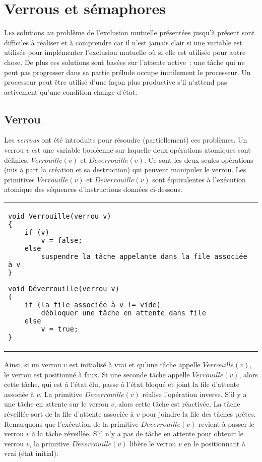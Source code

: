 \chapter{Verrous et sémaphores}
\startchapter

\lettrine[lines=4]{L}{es} solutions au problème de l'exclusion mutuelle présentées jusqu'à présent sont difficiles à réaliser et à comprendre car il n'est jamais clair si une variable est utilisée pour implémenter l'exclusion mutuelle où si elle est utilisée pour autre chose.
De plus ces solutions sont basées sur l'attente active~:  une tâche qui ne peut pas progresser dans sa partie prélude occupe inutilement le processeur.  Un processeur peut être utilisé d'une façon plus productive s'il n'attend pas activement qu'une condition change d'état.

\section{Verrou}\label{verrou:intro}
Les {\em verrous} ont été introduits pour résoudre (partiellement) ces problèmes. Un verrou $v$ est une variable booléenne sur laquelle deux opérations atomiques sont définies, $Verrouille(v)$ et $D\acute{e}verrouille(v)$.  Ce sont les deux seules opérations (mis à part la création et sa destruction) qui peuvent manipuler le verrou.
Les primitives $Verrouille(v)$ et $D\acute{e}verrouille(v)$ sont équivalentes à l'exécution atomique des séquences d'instructions données ci-dessous.

\centering
\begin{tabular}{l}
\lstset{language=C++}
\begin{lstlisting}
void Verrouille(verrou v)
{
	if (v)
		v = false;
	else
		suspendre la tâche appelante dans la file associée à v
}

void Déverrouille(verrou v)
{
	if (la file associée à v != vide)
		débloquer une tâche en attente dans file
	else
		v = true;
}
\end{lstlisting}
\end{tabular}

\par
Ainsi, si un verrou $v$ est initialisé à vrai et qu'une tâche appelle $Verrouille(v)$, le verrou est positionné à faux. Si une seconde tâche appelle $Verrouille(v)$, alors cette tâche, qui est à l'état élu, passe à l'état bloqué et joint la file d'attente associée à $v$.
La primitive $D\acute{e}verrouille(v)$ réalise l'opération inverse. S'il y a une tâche en attente sur le verrou $v$, alors cette tâche est réactivée. La tâche réveillée sort de la file d'attente associée à $v$ pour joindre la file des tâches prêtes. Remarquons que l'exécution de la primitive $D\acute{e}verrouille(v)$ revient à passer le verrou $v$ à la tâche réveillée.
S'il n'y a pas de tâche en attente pour obtenir le verrou $v$, la primitive $D\acute{e}verrouille(v)$ libère le verrou $v$ en le positionnant à vrai (état initial).

